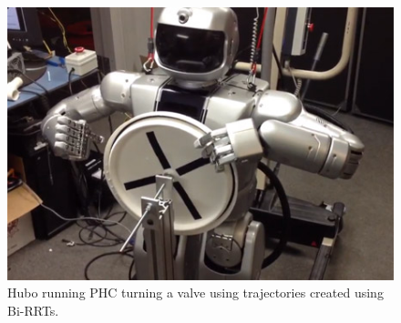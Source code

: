 \begin{figure}[thpb]
  \centering
\includegraphics[width=1.0\columnwidth]{./pix/hubo_valve.png}
  \caption{Hubo running PHC turning a valve using trajectories created using Bi-RRTs. }
  \label{fig:valve}
\end{figure}




